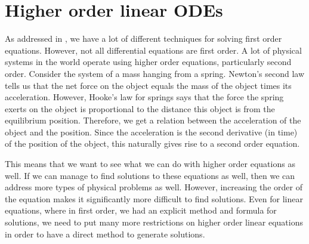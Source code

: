 \chapter{Higher order linear ODEs} \label{ho:chapter}
\renewcommand{\thesection}{\thechapter.\the\value{section}}

As addressed in , we have a lot of different techniques for solving first order equations. However, not all differential equations are first order. A lot of physical systems in the world operate using higher order equations, particularly second order. Consider the system of a mass hanging from a spring. Newton's second law tells us that the net force on the object equals the mass of the object times its acceleration. However, Hooke's law for springs says that the force the spring exerts on the object is proportional to the distance this object is from the equilibrium position. Therefore, we get a relation between the acceleration of the object and the position. Since the acceleration is the second derivative (in time) of the position of the object, this naturally gives rise to a second order equation. 

This means that we want to see what we can do with higher order equations as well. If we can manage to find solutions to these equations as well, then we can address more types of physical problems as well. However, increasing the order of the equation makes it significantly more difficult to find solutions. Even for linear equations, where in first order, we had an explicit method and formula for solutions, we need to put many more restrictions on higher order linear equations in order to have a direct method to generate solutions.






\sectionnewpage




\sectionnewpage



